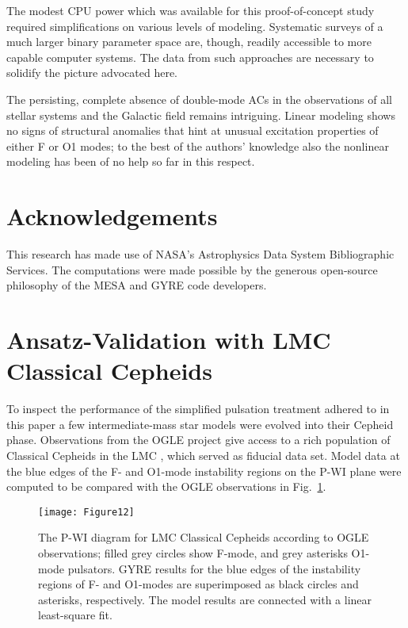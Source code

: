 \documentclass[a4paper,fleqn,usenatbib]{mnras}
\begin{document}
The modest CPU power which was available for this proof-of-concept study required simplifications
on various levels of modeling. Systematic surveys of a much larger binary parameter space are,
though, readily accessible to more capable computer systems. 
The data from such approaches are necessary to solidify the picture advocated here.

The persisting, complete absence of double-mode ACs in the observations 
of all stellar systems and the Galactic field remains intriguing. 
Linear modeling shows no signs of structural anomalies that 
hint at unusual excitation properties of either F or O1 modes; to the best of the
authors' knowledge also the nonlinear modeling has been of no help so far in this respect. 
 

\section*{Acknowledgements}
This research has made use of NASA's Astrophysics Data System Bibliographic Services. 
The computations were made possible by the generous open-source philosophy of the 
MESA and GYRE code developers. 


  

\appendix
\section{Ansatz-Validation with LMC Classical Cepheids}
\label{sec:validation}

To inspect the performance of the simplified pulsation treatment 
adhered to in this paper a few intermediate-mass star models were 
evolved into their Cepheid phase. 
Observations from the OGLE project give access to a rich 
population of Classical Cepheids in the LMC \citep{Soszynski2008a}, 
which served as fiducial data set. 
Model data at the blue edges of the F- and O1-mode instability regions on 
the P-WI plane were computed to be compared with the OGLE observations in 
Fig.~\ref{fig:PWI_LMCDCEP}.

\begin{figure}
	\texttt{[image: Figure12]}
    \caption{The P-WI diagram for LMC Classical Cepheids according to 
             OGLE observations; filled grey circles show
    	     F-mode, and grey asterisks O1-mode pulsators. 
    	     GYRE results for the blue edges of the instability regions 
    	     of F- and O1-modes are superimposed as black circles and asterisks, 
    	     respectively. The model results are connected with a linear 
    	     least-square fit.}
    \label{fig:PWI_LMCDCEP}
\end{figure}
\end{document}
